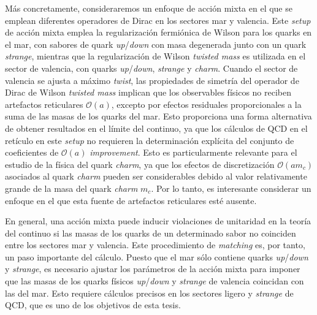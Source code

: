 Más concretamente, consideraremos un enfoque de acción mixta en el que se emplean diferentes operadores de Dirac en los sectores mar y valencia. Este \textit{setup} de acción mixta emplea la regularización fermiónica de Wilson para los quarks en el mar, con sabores de quark \textit{up}/\textit{down} con masa degenerada junto con un quark \textit{strange}, mientras que la regularización de Wilson \textit{twisted mass} es utilizada en el sector de valencia, con quarks \textit{up}/\textit{down}, \textit{strange} y \textit{charm}. Cuando el sector de valencia se ajusta a máximo \textit{twist}, las propiedades de simetría del operador de Dirac de Wilson \textit{twisted mass} implican que los observables físicos no reciben artefactos reticulares $\mathcal{O}(a)$, excepto por efectos residuales proporcionales a la suma de las masas de los quarks del mar.
Esto proporciona una forma alternativa de obtener resultados en el límite del continuo, ya que los cálculos de QCD en el retículo en este \textit{setup} no requieren la determinación explícita del conjunto de coeficientes de $\mathcal{O}(a)$ \textit{improvement}. Esto es particularmente relevante para el estudio de la física del quark \textit{charm}, ya que los efectos de discretización $\mathcal{O}(am_c)$ asociados al quark \textit{charm} pueden ser considerables debido al valor relativamente grande de la masa del quark \textit{charm} $m_c$.  Por lo tanto, es interesante considerar un enfoque en el que esta fuente de artefactos reticulares esté ausente.

En general, una acción mixta puede inducir violaciones de unitaridad en la teoría del continuo si las masas de los quarks de un determinado sabor no coinciden entre los sectores mar y valencia. Este procedimiento de \textit{matching} es, por tanto, un paso importante del cálculo. Puesto que el mar sólo contiene quarks \textit{up}/\textit{down} y \textit{strange}, es necesario ajustar los parámetros de la acción mixta para imponer que las masas de los quarks físicos \textit{up}/\textit{down} y \textit{strange} de valencia coincidan con las del mar. Esto requiere cálculos precisos en los sectores ligero y \textit{strange} de QCD, que es uno de los objetivos de esta tesis.



